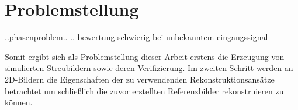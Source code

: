 \chapter{Problemstellung}

..phasenproblem..
.. bewertung schwierig bei unbekanntem eingangssignal

Somit ergibt sich als Problemstellung dieser Arbeit erstens die Erzeugung von simulierten Streubildern sowie deren Verifizierung.
Im zweiten Schritt werden an 2D-Bildern die Eigenschaften der zu verwendenden Rekonstruktionsansätze betrachtet um schließlich die zuvor erstellten Referenzbilder rekonstruieren zu können.
